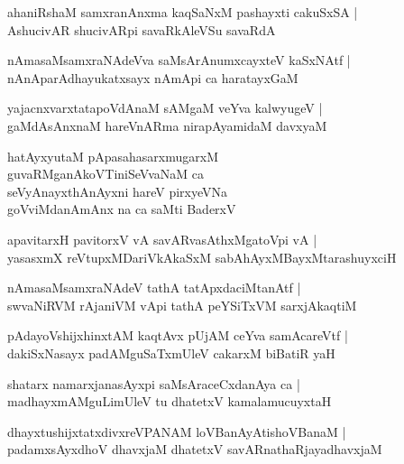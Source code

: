 \documentclass[twoside,12pt,openright]{book}
\newcounter{shloka}[chapter]
\begin{document}
\begin{shloka}%
ahaniRshaM samxranAnxma kaqSaNxM pashayxti cakuSxSA |\\
AshucivAR shucivARpi savaRkAleVSu savaRdA 
\end{shloka}

\begin{shloka}%
nAmasaMsamxraNAdeVva saMsArAnumxcayxteV kaSxNAtf |\\
nAnAparAdhayukatxsayx nAmApi ca haratayxGaM 
\end{shloka}

\begin{shloka}%
yajacnxvarxtatapoVdAnaM sAMgaM veYva kalwyugeV |\\
gaMdAsAnxnaM hareVnARma nirapAyamidaM davxyaM 
\end{shloka}

\begin{shloka}%
hatAyxyutaM pApasahasarxmugarxM \\
guvaRMganAkoVTiniSeVvaNaM ca \\
seVyAnayxthAnAyxni hareV pirxyeVNa \\
goVviMdanAmAnx na ca saMti BaderxV
\end{shloka}

\begin{shloka}%
apavitarxH pavitorxV vA savARvasAthxMgatoVpi vA |\\
yasasxmX reVtupxMDariVkAkaSxM sabAhAyxMBayxMtarashuyxciH
\end{shloka}

\begin{shloka}%
nAmasaMsamxraNAdeV tathA tatApxdaciMtanAtf |\\
swvaNiRVM rAjaniVM vApi tathA peYSiTxVM sarxjAkaqtiM 
\end{shloka}

\begin{shloka}%
pAdayoVshijxhinxtAM kaqtAvx pUjAM ceYva samAcareVtf |\\
dakiSxNasayx padAMguSaTxmUleV cakarxM biBatiR yaH 
\end{shloka}

\begin{shloka}%
shatarx namarxjanasAyxpi saMsAraceCxdanAya ca |\\
madhayxmAMguLimUleV tu dhatetxV kamalamucuyxtaH 
\end{shloka}

\begin{shloka}%
dhayxtushijxtatxdivxreVPANAM loVBanAyAtishoVBanaM |\\
padamxsAyxdhoV dhavxjaM dhatetxV savARnathaRjayadhavxjaM 
\end{shloka}
\end{document}
